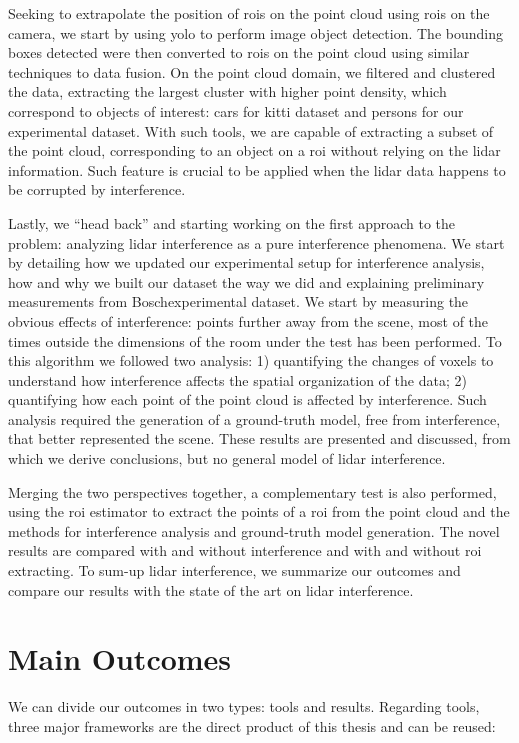 Seeking to extrapolate the position of \acp{roi} on the point cloud using \acp{roi} on the camera, we start by using \ac{yolo} to perform image object detection. The bounding boxes detected were then converted to \acp{roi} on the point cloud using similar techniques to data fusion. On the point cloud domain, we filtered and clustered the data, extracting the largest cluster with higher point density, which correspond to objects of interest: cars for \ac{kitti} dataset and persons for our experimental dataset. With such tools, we are capable of extracting a subset of the point cloud, corresponding to an object on a \ac{roi} without relying on the \ac{lidar} information. Such feature is crucial to be applied when the \ac{lidar} data happens to be corrupted by interference.

Lastly, we ``head back'' and starting working on the first approach to the problem: analyzing \ac{lidar} interference as a pure interference phenomena. We start by detailing how we updated our experimental setup for interference analysis, how and why we built our dataset the way we did and explaining preliminary measurements from Bosch\cp experimental dataset. We start by measuring the obvious effects of interference: points further away from the scene, most of the times outside the dimensions of the room under the test has been performed. To this algorithm we followed two analysis: 1) quantifying the changes of voxels to understand how interference affects the spatial organization of the data; 2) quantifying how each point of the point cloud is affected by interference. Such analysis required the generation of a ground-truth model, free from interference, that better represented the scene. These results are presented and discussed, from which we derive conclusions, but no general model of \ac{lidar} interference.

Merging the two perspectives together, a complementary test is also performed, using the \ac{roi} estimator to extract the points of a \ac{roi} from the point cloud and the methods for interference analysis and ground-truth model generation. The novel results are compared with and without interference and with and without \ac{roi} extracting. To sum-up \ac{lidar} interference, we summarize our outcomes and compare our results with the state of the art on \ac{lidar} interference.

\section{Main Outcomes}
\label{sec:conclusion:main-outcomes}
We can divide our outcomes in two types: tools and results. Regarding tools, three major frameworks are the direct product of this thesis and can be reused:

